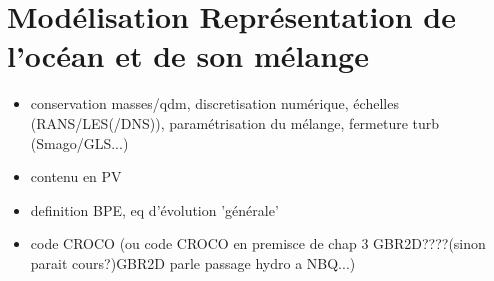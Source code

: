 \documentclass[a4paper,12pt,notitlepage]{report}
\numberwithin{equation}{section}
\begin{document}
\chapter{Mod\'elisation  Repr\'esentation de l'oc\'ean et de son m\'elange}
\begin{itemize}
\item conservation masses/qdm, discretisation numérique, échelles (RANS/LES(/DNS)), paramétrisation du mélange, fermeture turb (Smago/GLS...)
\item contenu en PV
\item definition BPE, eq d'évolution 'générale'
\item code CROCO (ou code CROCO en premisce de chap 3 GBR2D????(sinon parait cours?)GBR2D parle passage hydro a NBQ...)
\end{itemize}
\end{document}

